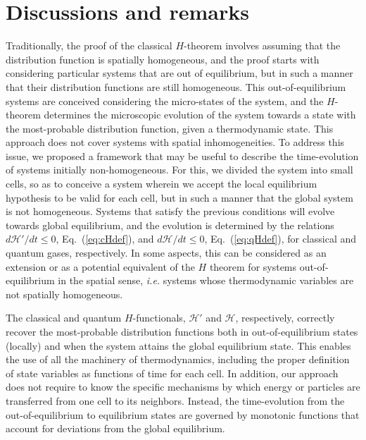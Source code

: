 
\color{black}
\section{Discussions and remarks}\label{sec:disscussion}

Traditionally, the proof of the classical $H$-theorem involves assuming that the
distribution function is spatially homogeneous, and the proof starts with
considering particular systems that are out of equilibrium, but in such a manner
that their distribution functions are still homogeneous. This out-of-equilibrium systems
are conceived considering the micro-states of the system, and the $H$-theorem determines
the microscopic evolution of the system towards a state with the most-probable distribution function,
given a thermodynamic state. 
This approach does not cover systems with spatial inhomogeneities.
To address this issue, we
proposed a framework that may be useful to describe the time-evolution of systems
initially non-homogeneous. For this, we divided the
system into small cells, so as to conceive a system wherein we accept the local equilibrium
hypothesis to be valid for each cell, but in such a manner that the global system is not homogeneous. Systems
that satisfy the previous conditions will evolve towards global equilibrium, and the evolution is
determined by the relations $d\mathcal{H}'/dt\leq0$, Eq.~(\ref{eq:cHdef}),
and $d\mathcal{H}/dt\leq0$, Eq.~(\ref{eq:qHdef}), for classical and quantum gases, respectively.
In some aspects, this can be considered as an extension or as a potential equivalent of the $H$ theorem
for systems out-of-equilibrium in the spatial sense, \textit{i.e.} systems whose thermodynamic
variables are not spatially homogeneous.

The classical and quantum $H$-functionals, $\mathcal{H}'$ and $\mathcal{H}$, respectively,
correctly recover the most-probable distribution
functions both in out-of-equilibrium states (locally) and when the system attains the global
equilibrium state. This enables the use of all the machinery of thermodynamics, including the
proper definition of state variables as functions of time for each cell. In addition, our approach
does not require to know the specific mechanisms by which energy or particles are transferred from one
cell to its neighbors. Instead, the time-evolution from the out-of-equilibrium to equilibrium states are
governed by monotonic functions that account for deviations from the global equilibrium.

